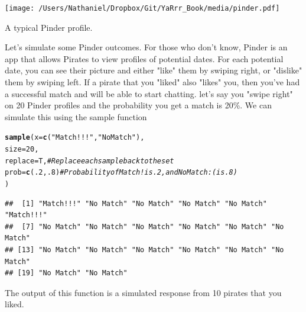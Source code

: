 \documentclass{tufte-book}\usepackage[]{graphicx}\usepackage[]{color}
\makeatletter
\newcommand{\hlnum}[1]{\textcolor[rgb]{0.686,0.059,0.569}{#1}}%
\newcommand{\hlstr}[1]{\textcolor[rgb]{0.192,0.494,0.8}{#1}}%
\newcommand{\hlcom}[1]{\textcolor[rgb]{0.678,0.584,0.686}{\textit{#1}}}%
\newcommand{\hlstd}[1]{\textcolor[rgb]{0.345,0.345,0.345}{#1}}%
\newcommand{\hlkwc}[1]{\textcolor[rgb]{0.333,0.667,0.333}{#1}}%
\newcommand{\hlkwd}[1]{\textcolor[rgb]{0.737,0.353,0.396}{\textbf{#1}}}%
\newenvironment{kframe}{%
 \def\at@end@of@kframe{}%
 \ifinner\ifhmode%
  \def\at@end@of@kframe{\end{minipage}}%
  \begin{minipage}{\columnwidth}%
 \fi\fi%
 \def\FrameCommand##1{\hskip\@totalleftmargin \hskip-\fboxsep
 \colorbox{shadecolor}{##1}\hskip-\fboxsep
     \hskip-\linewidth \hskip-\@totalleftmargin \hskip\columnwidth}%
 \MakeFramed {\advance\hsize-\width
   \@totalleftmargin\z@ \linewidth\hsize
   \@setminipage}}%
 {\par\unskip\endMakeFramed%
 \at@end@of@kframe}
\newenvironment{knitrout}{}{} %
\makeatother
\begin{document}
\begin{marginfigure}
\texttt{[image: /Users/Nathaniel/Dropbox/Git/YaRrr\_Book/media/pinder.pdf]}
\caption{A typical Pinder profile.}
\label{fig:pinder}
\end{marginfigure}


Let's simulate some Pinder outcomes. For those who don't know, Pinder is an app that allows Pirates to view profiles of potential dates. For each potential date, you can see their picture and either "like" them by swiping right, or "dislike" them by swiping left. If a pirate that you "liked" also "likes" you, then you've had a successful match and will be able to start chatting. let's say you "swipe right" on 20 Pinder profiles and the probability you get a match is 20\%. We can simulate this using the sample function

\begin{footnotesize}
\begin{knitrout}
\color{fgcolor}\begin{kframe}
\begin{alltt}
\hlkwd{sample}\hlstd{(}\hlkwc{x} \hlstd{=} \hlkwd{c}\hlstd{(}\hlstr{"Match!!!"}\hlstd{,} \hlstr{"No Match"}\hlstd{),}
       \hlkwc{size} \hlstd{=} \hlnum{20}\hlstd{,}
       \hlkwc{replace} \hlstd{= T,} \hlcom{# Replace each sample back to the set}
       \hlkwc{prob} \hlstd{=} \hlkwd{c}\hlstd{(}\hlnum{.2}\hlstd{,} \hlnum{.8}\hlstd{)}  \hlcom{# Probability of Match! is .2, and No Match :( is .8)}
       \hlstd{)}
\end{alltt}
\begin{verbatim}
##  [1] "Match!!!" "No Match" "No Match" "No Match" "No Match" "Match!!!"
##  [7] "No Match" "No Match" "No Match" "No Match" "No Match" "No Match"
## [13] "No Match" "No Match" "No Match" "No Match" "No Match" "No Match"
## [19] "No Match" "No Match"
\end{verbatim}
\end{kframe}
\end{knitrout}
\end{footnotesize}

The output of this function is a simulated response from 10 pirates that you liked. 

\end{document}
